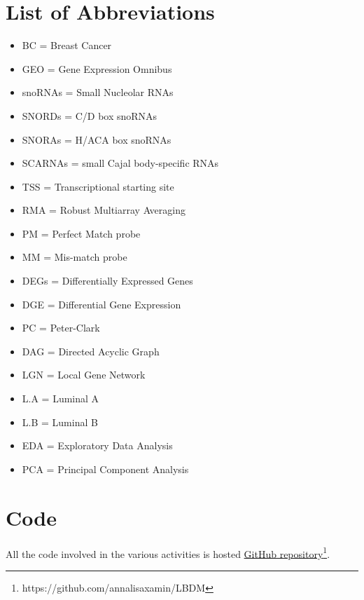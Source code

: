 \documentclass[journal]{IEEEtran}
\begin{document}
\section{List of Abbreviations}
\begin{itemize}
    \item BC = Breast Cancer
    \item GEO = Gene Expression Omnibus
    \item snoRNAs = Small Nucleolar RNAs
    \item SNORDs = C/D box snoRNAs
    \item SNORAs = H/ACA box snoRNAs
    \item SCARNAs = small Cajal body-specific RNAs
    \item TSS = Transcriptional starting site
    \item RMA = Robust Multiarray Averaging
    \item PM = Perfect Match probe
    \item MM = Mis-match probe
    \item DEGs = Differentially Expressed Genes
    \item DGE = Differential Gene Expression
    \item PC = Peter-Clark
    \item DAG = Directed Acyclic Graph
    \item LGN = Local Gene Network
    \item L.A = Luminal A
    \item L.B = Luminal B
    \item EDA = Exploratory Data Analysis
    \item PCA = Principal Component Analysis
\end{itemize}

\section{Code}
All the code involved in the various activities is hosted \href{https://github.com/annalisaxamin/LBDM}{GitHub repository}\footnote{https://github.com/annalisaxamin/LBDM}.

\ifCLASSOPTIONcaptionsoff
  \newpage
\fi

\onecolumn
\end{document}
